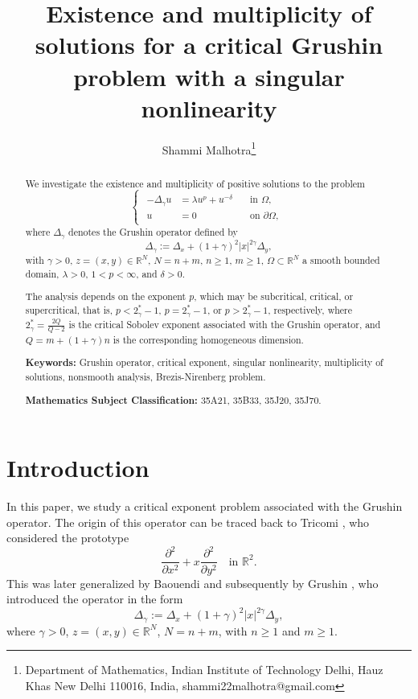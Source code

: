 \documentclass[11pt]{article}
\title{Existence and multiplicity of solutions for a critical Grushin problem with a singular nonlinearity}
\author{Shammi Malhotra\footnote{Department of Mathematics, Indian Institute of Technology Delhi, Hauz Khas New Delhi 110016,  India, shammi22malhotra@gmail.com}}
\date{}
\newcommand{\real}{\mathbb{R}}
\newcommand{\rnn}{\mathbb{R}^{N}}
\newcommand{\Gr}{\Delta_{\gamma}}
\begin{document}
\maketitle


\begin{abstract}
\noindent We investigate the existence and multiplicity of positive solutions to the problem
\begin{equation*}
\begin{cases}
\begin{aligned}
    - \Delta_{\gamma} u &= \lambda u^{p} + u^{-\delta} &\quad \text{in } \Omega,\\
    u &= 0 &\quad \text{on } \partial \Omega,
\end{aligned}
\end{cases}
\end{equation*}
where $\Delta_{\gamma}$ denotes the Grushin operator defined by
\begin{equation*}
\Delta_{\gamma} := \Delta_x + (1+\gamma)^2 |x|^{2\gamma}\Delta_y,
\end{equation*}
with $\gamma>0$, $z=(x,y)\in \rnn$, $N=n+m$, $n\geq 1$, $m\geq 1$, $\Omega \subset \rnn$ a smooth bounded domain, $\lambda>0$, $1<p<\infty$, and $\delta>0$.

\noindent The analysis depends on the exponent $p$, which may be subcritical, critical, or supercritical, that is, $p<2_\gamma^*-1$, $p=2_\gamma^*-1$, or $p>2_\gamma^*-1$, respectively, where $2_\gamma^*=\frac{2Q}{Q-2}$ is the critical Sobolev exponent associated with the Grushin operator, and $Q=m+(1+\gamma)n$ is the corresponding homogeneous dimension.

\medskip
\noindent \textbf{Keywords:} Grushin operator, critical exponent, singular nonlinearity, multiplicity of solutions, nonsmooth analysis, Brezis-Nirenberg problem.

\medskip
\noindent \textbf{Mathematics Subject Classification:} 35A21, 35B33, 35J20, 35J70.
\end{abstract}


\section{Introduction}


In this paper, we study a critical exponent problem associated with the Grushin operator. The origin of this operator can be traced back to Tricomi \cite{tricomi_grushin}, who considered the prototype
\begin{equation*}
    \frac{\partial^2}{\partial x^2} + x \frac{\partial^2}{\partial y^2} \quad \text{in } \real^2.
\end{equation*}
This was later generalized by Baouendi \cite{baouendi_phd_thesis} and subsequently by Grushin \cite{grushin_origin}, who introduced the operator in the form
\begin{equation*}
    \Gr := \Delta_x + (1+\gamma)^2 |x|^{2\gamma} \Delta_y,
\end{equation*}
where $\gamma > 0$, $z = (x,y) \in \rnn$, $N = n + m$, with $n \geq 1$ and $m \geq 1$.
\end{document}
